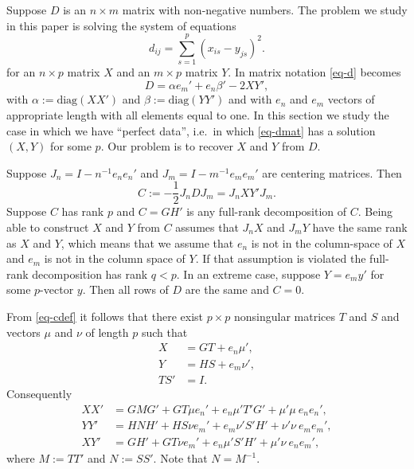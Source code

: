 \documentclass[
  12pt,
  letterpaper,
  DIV=11,
  numbers=noendperiod]{scrartcl}
\begin{document}
Suppose \(D\) is an \(n \times m\) matrix with non-negative numbers. The
problem we study in this paper is solving the system of equations
\begin{equation}
  d_{ij} = \sum_{s=1}^p(x_{is} - y_{js})^2.\label{eq-d}
\end{equation} for an \(n \times p\) matrix \(X\) and an \(m \times p\)
matrix \(Y\). In matrix notation \eqref{eq-d} becomes \begin{equation}
  D = \alpha e_m' + e_n\beta' - 2XY',\label{eq-dmat}
\end{equation} with \(\alpha := \text{diag}(XX')\) and
\(\beta := \text{diag}(YY')\) and with \(e_n\) and \(e_m\) vectors of
appropriate length with all elements equal to one. In this section we
study the case in which we have ``perfect data'', i.e.~in which
\eqref{eq-dmat} has a solution \((X,Y)\) for some \(p\). Our problem is
to recover \(X\) and \(Y\) from \(D\).

Suppose \(J_n = I - n^{-1}e_ne_n'\) and \(J_m = I - m^{-1}e_me_m'\) are
centering matrices. Then \begin{equation}
  C := -\frac12 J_nDJ_m = J_nXY'J_m.\label{eq-cdef}
\end{equation} Suppose \(C\) has rank \(p\) and \(C = GH'\) is any
full-rank decomposition of \(C\). Being able to construct \(X\) and
\(Y\) from \(C\) assumes that \(J_nX\) and \(J_mY\) have the same rank
as \(X\) and \(Y\), which means that we assume that \(e_n\) is not in
the column-space of \(X\) and \(e_m\) is not in the column space of
\(Y\). If that assumption is violated the full-rank decomposition has
rank \(q < p\). In an extreme case, suppose \(Y = e_my'\) for some
\(p\)-vector \(y\). Then all rows of \(D\) are the same and \(C = 0\).

From \eqref{eq-cdef} it follows that there exist \(p \times p\)
nonsingular matrices \(T\) and \(S\) and vectors \(\mu\) and \(\nu\) of
length \(p\) such that \begin{subequations}
  \begin{align}
    X   & = GT + e_n\mu', \\
    Y   & = HS + e_m\nu', \\
    TS' & = I.
  \end{align}
\end{subequations} Consequently \begin{subequations}
  \begin{align}
    XX' & = GMG' + GT\mu e_n' + e_n\mu'T'G' + \mu'\mu\ e_ne_n',\label{eq-5a} \\
    YY' & = HNH' + HS\nu e_m' + e_m\nu'S'H' + \nu'\nu\ e_me_m',\label{eq-5b} \\
    XY' & = GH' + GT\nu e_m' + e_n\mu'S'H' + \mu'\nu\ e_ne_m',\label{eq-5c}
  \end{align}
\end{subequations} where \(M := TT'\) and \(N := SS'\). Note that
\(N = M^{-1}\).
\end{document}
